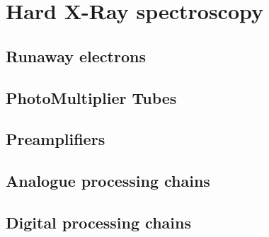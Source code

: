 \section{Hard X-Ray spectroscopy}
\subsection{Runaway electrons}
\subsection{PhotoMultiplier Tubes}
\subsection{Preamplifiers}
\subsection{Analogue processing chains}
\subsection{Digital processing chains}